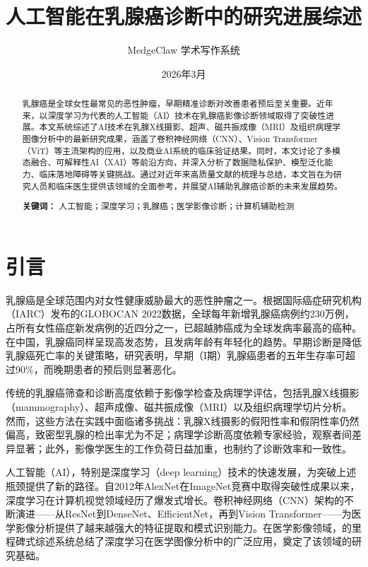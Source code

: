 \documentclass[12pt,a4paper]{article}
\title{\textbf{人工智能在乳腺癌诊断中的研究进展综述}}
\author{MedgeClaw 学术写作系统}
\date{2026年3月}
\begin{document}
\maketitle

\begin{abstract}
乳腺癌是全球女性最常见的恶性肿瘤，早期精准诊断对改善患者预后至关重要。近年来，以深度学习为代表的人工智能（AI）技术在乳腺癌影像诊断领域取得了突破性进展。本文系统综述了AI技术在乳腺X线摄影、超声、磁共振成像（MRI）及组织病理学图像分析中的最新研究成果，涵盖了卷积神经网络（CNN）、Vision Transformer（ViT）等主流架构的应用，以及商业AI系统的临床验证结果。同时，本文讨论了多模态融合、可解释性AI（XAI）等前沿方向，并深入分析了数据隐私保护、模型泛化能力、临床落地障碍等关键挑战。通过对近年来高质量文献的梳理与总结，本文旨在为研究人员和临床医生提供该领域的全面参考，并展望AI辅助乳腺癌诊断的未来发展趋势。

\noindent\textbf{关键词：} 人工智能；深度学习；乳腺癌；医学影像诊断；计算机辅助检测
\end{abstract}

\section{引言}

乳腺癌是全球范围内对女性健康威胁最大的恶性肿瘤之一。根据国际癌症研究机构（IARC）发布的GLOBOCAN 2022数据，全球每年新增乳腺癌病例约230万例，占所有女性癌症新发病例的近四分之一，已超越肺癌成为全球发病率最高的癌种\citep{bray2024global}。在中国，乳腺癌同样呈现高发态势，且发病年龄有年轻化的趋势。早期诊断是降低乳腺癌死亡率的关键策略，研究表明，早期（I期）乳腺癌患者的五年生存率可超过90\%，而晚期患者的预后则显著恶化\citep{sung2021global}。

传统的乳腺癌筛查和诊断高度依赖于影像学检查及病理学评估，包括乳腺X线摄影（mammography）、超声成像、磁共振成像（MRI）以及组织病理学切片分析。然而，这些方法在实践中面临诸多挑战：乳腺X线摄影的假阳性率和假阴性率仍然偏高，致密型乳腺的检出率尤为不足；病理学诊断高度依赖专家经验，观察者间差异显著；此外，影像学医生的工作负荷日益加重，也制约了诊断效率和一致性。

人工智能（AI），特别是深度学习（deep learning）技术的快速发展，为突破上述瓶颈提供了新的路径。自2012年AlexNet在ImageNet竞赛中取得突破性成果以来\citep{krizhevsky2012imagenet}，深度学习在计算机视觉领域经历了爆发式增长\citep{lecun2015deep}。卷积神经网络（CNN）架构的不断演进——从ResNet\citep{he2016deep}到DenseNet\citep{huang2017densely}、EfficientNet\citep{tan2019efficientnet}，再到Vision Transformer\citep{dosovitskiy2021image}——为医学影像分析提供了越来越强大的特征提取和模式识别能力。在医学影像领域，\citet{litjens2017survey}的里程碑式综述系统总结了深度学习在医学图像分析中的广泛应用，奠定了该领域的研究基础。
\end{document}
